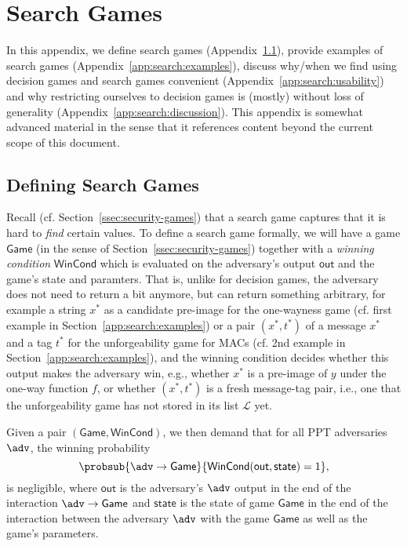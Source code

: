 \section{Search Games}\label{app:search}
In this appendix, we define search games (Appendix~\ref{app:search:def}), provide examples of search games (Appendix~\ref{app:search:examples}), discuss why/when we find using decision games and search games convenient (Appendix~\ref{app:search:usability}) and why restricting ourselves to decision games is (mostly) without loss of generality (Appendix~\ref{app:search:discussion}). This appendix is somewhat advanced material in the sense that it references content beyond the
current scope of this document.

\subsection{Defining Search Games}\label{app:search:def}
Recall (cf. Section~\ref{ssec:security-games}) that a search game captures that it is hard to \emph{find} certain values.
To define a search game formally, we will have a game $\mathsf{Game}$ (in the sense of Section~\ref{ssec:security-games})
together with a \emph{winning condition} $\mathsf{WinCond}$
which is evaluated on the adversary's output $\mathsf{out}$ and the game's state and paramters. That is, unlike for decision games,
the adversary does not need to return a bit anymore, but can return something arbitrary, for example a string $x^*$ as a
candidate pre-image for the one-wayness game (cf. first example in Section~\ref{app:search:examples}) or a pair $(x^*,t^*)$ of
a message $x^*$ and a tag $t^*$ for the unforgeability game for MACs (cf. 2nd example in Section~\ref{app:search:examples}),
and the winning condition decides whether this output makes the adversary win, e.g., whether $x^*$ is a pre-image of $y$
under the one-way function $f$, or whether $(x^*,t^*)$ is a fresh message-tag pair, i.e., one that the unforgeability game
has not stored in its list $\mathcal{L}$ yet.

Given a pair $(\mathsf{Game},\mathsf{WinCond})$, we then demand that for all PPT adversaries $\adv$, the winning probability
\[\probsub{\adv\rightarrow\mathsf{Game}}{\mathsf{WinCond}(\mathsf{out},\mathsf{state})=1},\]
is negligible, where $\mathsf{out}$ is the adversary's $\adv$ output in the end of the interaction $\adv\rightarrow\mathsf{Game}$ and $\mathsf{state}$ is the state of game $\mathsf{Game}$ in the end of the interaction
between the adversary $\adv$ with the game $\mathsf{Game}$ as well as the game's parameters.

